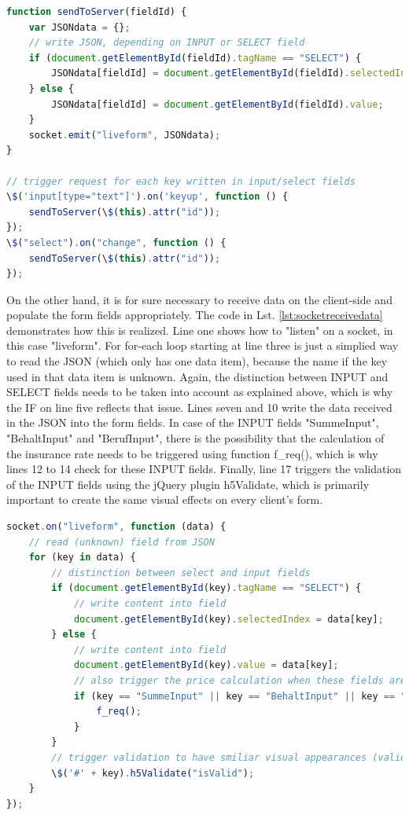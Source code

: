 \begin{lstlisting}[language=javascript,caption={Sending data to the server},label=lst:socketsenddata]
function sendToServer(fieldId) {
    var JSONdata = {};
    // write JSON, depending on INPUT or SELECT field
    if (document.getElementById(fieldId).tagName == "SELECT") {
        JSONdata[fieldId] = document.getElementById(fieldId).selectedIndex;
    } else {
        JSONdata[fieldId] = document.getElementById(fieldId).value;
    }
    socket.emit("liveform", JSONdata);
}

// trigger request for each key written in input/select fields
\$('input[type="text"]').on('keyup', function () {
    sendToServer(\$(this).attr("id"));
});
\$("select").on("change", function () {
    sendToServer(\$(this).attr("id"));
});
\end{lstlisting}

On the other hand, it is for sure necessary to receive data on the client-side and populate the form fields appropriately. The code in Lst. \ref{lst:socketreceivedata} demonstrates how this is realized. Line one shows how to "listen" on a socket, in this case "liveform". For for-each loop starting at line three is just a simplied way to read the JSON (which only has one data item), because the name if the key used in that data item is unknown. Again, the distinction between INPUT and SELECT fields needs to be taken into account as explained above, which is why the IF on line five reflects that issue. Lines seven and 10 write the data received in the JSON into the form fields. In case of the INPUT fields "SummeInput", "BehaltInput" and "BerufInput", there is the possibility that the calculation of the insurance rate needs to be triggered using function f\_req(), which is why lines 12 to 14 check for these INPUT fields. Finally, line 17 triggers the validation of the INPUT fields using the jQuery plugin h5Validate, which is primarily important to create the same visual effects on every client's form.

\begin{lstlisting}[language=javascript,caption={Receiving data using WebSockets},label=lst:socketreceivedata]
socket.on("liveform", function (data) {
    // read (unknown) field from JSON
    for (key in data) {
        // distinction between select and input fields
        if (document.getElementById(key).tagName == "SELECT") {
            // write content into field
            document.getElementById(key).selectedIndex = data[key];
        } else {
            // write content into field
            document.getElementById(key).value = data[key];
            // also trigger the price calculation when these fields are filled
            if (key == "SummeInput" || key == "BehaltInput" || key == "BerufInput") {
                f_req();
            }
        }
        // trigger validation to have smiliar visual appearances (valid/invalid) for the fields
        \$('#' + key).h5Validate("isValid");
    }
});
\end{lstlisting}

